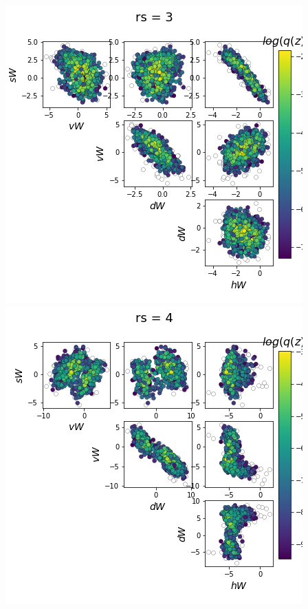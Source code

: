 \documentclass[11pt]{article}
\begin{document}
\begin{center}
\includegraphics[scale=0.33]{figs/Z_SC_pvar_reduced_c=0_p=50_rs=3.png} \\
\includegraphics[scale=0.33]{figs/Z_SC_pvar_reduced_c=0_p=50_rs=4.png}

\end{center}
\end{document}
